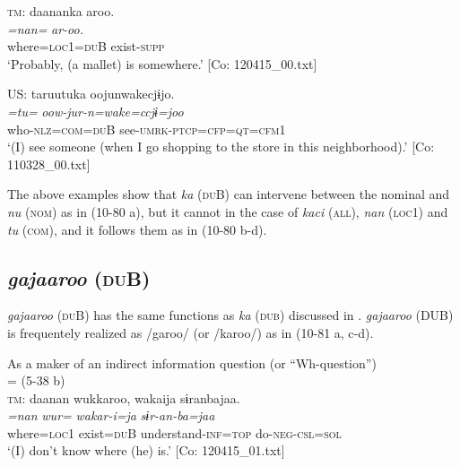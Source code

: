   \ex  \textsc{tm}:
      \glll    daananka  aroo.\\
      \textit{=nan=}  \textit{ar-oo.}\\
      where=\textsc{loc}1=\textsc{du}B  exist-\textsc{supp}\\
      \glt       ‘Probably, (a mallet) is somewhere.’ [Co: 120415\_00.txt]

  \ex   US: \glll taruutuka  oojunwakecjɨjo.\\
      \textit{=tu=}  \textit{oow-jur-n=wake=ccjɨ=joo}\\
      who-\textsc{nlz}=\textsc{com}=\textsc{du}B  see-\textsc{umrk}-\textsc{ptcp}=\textsc{cfp}=\textsc{qt}=\textsc{cfm}1\\
      \glt       ‘(I) see someone (when I go shopping to the store in this neighborhood).’ [Co: 110328\_00.txt]
    \z
\z

The above examples show that \textit{ka} (\textsc{du}B) can intervene between the nominal and \textit{nu} (\textsc{nom}) as in (10-80 a), but it cannot in the case of \textit{kaci} (\textsc{all}), \textit{nan} (\textsc{loc}1) and \textit{tu} (\textsc{com}), and it follows them as in (10-80 b-d).

\subsection{\textit{gajaaroo} (\textsc{du}B)}\label{sec:10.4.3}

\textit{gajaaroo} (\textsc{du}B) has the same functions as \textit{ka} (\textsc{dub}) discussed in . \textit{gajaaroo} (DUB) is frequentely realized as /garoo/ (or /karoo/) as in (10-81 a, c-d).

\ea\label{ex:10.81}   As a maker of an indirect information question (or “Wh-question”)\\
  \ea{} = (5-38 b)\\
    \textsc{tm}:
      \glll    daanan  wukkaroo,  wakaija  sɨranbajaa.\\
      \textit{=nan}  \textit{wur=}  \textit{wakar-i=ja}  \textit{sɨr-an-ba=jaa}\\
      where=\textsc{loc}1  exist=\textsc{du}B  understand-\textsc{inf}=\textsc{top}  do-\textsc{neg}-\textsc{csl}=\textsc{sol}\\
      \glt       ‘(I) don’t know where (he) is.’ [Co: 120415\_01.txt]

